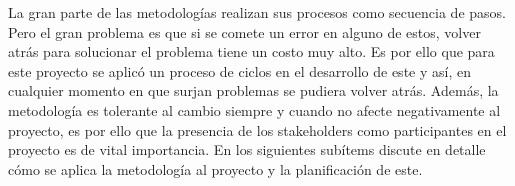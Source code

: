 La gran parte de las metodologías realizan sus procesos como secuencia de pasos. Pero el gran problema es que si se comete un error en alguno de estos, volver atrás para solucionar el problema tiene un costo muy alto. Es por ello que para este proyecto se aplicó un proceso de ciclos en el desarrollo de este y así, en cualquier momento en que surjan problemas se pudiera volver atrás. Además, la metodología es tolerante al cambio siempre y cuando no afecte negativamente al proyecto, es por ello que la presencia de los stakeholders como participantes en el proyecto es de vital importancia. En los siguientes subítems discute en detalle cómo se aplica la metodología al proyecto y la planificación de este.